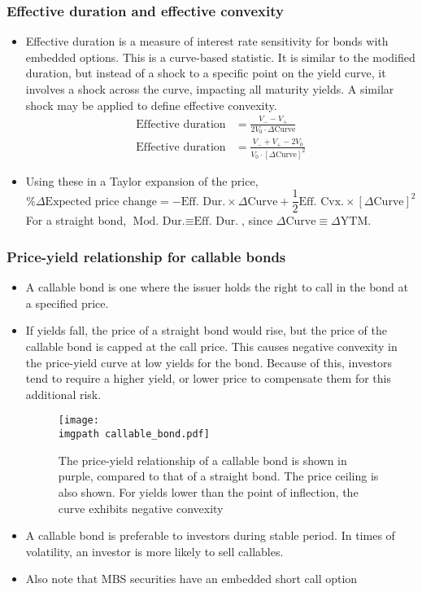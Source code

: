 \documentclass[../notes_compiled.tex]{subfiles}
\begin{document}
\subsubsection{Effective duration and effective convexity}
\begin{itemize}
\item Effective duration is a measure of interest rate sensitivity for bonds with embedded options. This is a curve-based statistic. It is similar to the modified duration, but instead of a shock to a specific point on the yield curve, it involves a shock across the curve, impacting all maturity yields. A similar shock may be applied to define effective convexity.
\begin{align}
\text{Effective duration} &= \frac{V_{-}-V_{+}}{2V_{0}\cdot\Delta\text{Curve}} \\
\text{Effective duration} &= \frac{V_{-}+V_{+}-2V_{0}}{V_{0}\cdot[\Delta\text{Curve}]^{2}}
\end{align}
\item Using these in a Taylor expansion of the price,
\begin{equation*}
\%\Delta\text{Expected price change} = - \text{Eff. Dur.} \times \Delta \text{Curve} + \frac{1}{2}\text{Eff. Cvx.} \times [\Delta \text{Curve}]^{2}
\end{equation*}
For a straight bond, $\text{Mod. Dur.} \equiv \text{Eff. Dur.}$, since $\Delta\text{Curve} \equiv \Delta \text{YTM}$.
\end{itemize}

\subsubsection{Price-yield relationship for callable bonds}
\begin{itemize}
\item A callable bond is one where the issuer holds the right to call in the bond at a specified price.
\item If yields fall, the price of a straight bond would rise, but the price of the callable bond is capped at the call price. This causes negative convexity in the price-yield curve at low yields for the bond. Because of this, investors tend to require a higher yield, or lower price to compensate them for this additional risk.


\begin{figure}[h]
  \centering
  \texttt{[image: \\imgpath callable\_bond.pdf]}
  \caption{The price-yield relationship of a callable bond is shown in purple, compared to that of a straight bond. The price ceiling is also shown. For yields lower than the point of inflection, the curve exhibits negative convexity}
\end{figure}

\item A callable bond is preferable to investors during stable period. In times of volatility, an investor is more likely to sell callables.
\item Also note that MBS securities have an embedded short call option

\end{itemize}
\end{document}
